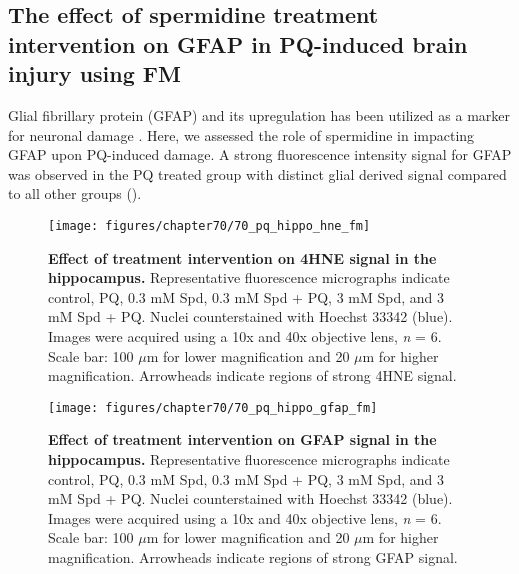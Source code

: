 \subsection{The effect of spermidine treatment intervention on GFAP in PQ-induced brain injury using FM} 
Glial fibrillary protein (GFAP) and its upregulation has been utilized as a marker for neuronal damage \citep{Wu2015}. Here, we assessed the role of spermidine in impacting GFAP upon PQ-induced damage. A strong fluorescence intensity signal for GFAP was observed in the PQ treated group with distinct glial derived signal compared to all other groups ().

\begin{landscape}
\begin{figure}[!htbp]
\center
  \texttt{[image: figures/chapter70/70\_pq\_hippo\_hne\_fm]}
  \caption[Effect of treatment intervention on 4HNE signal in the hippocampus]{\textbf{Effect of treatment intervention on 4HNE signal in the hippocampus.} Representative fluorescence micrographs indicate control, PQ, 0.3 mM Spd, 0.3 mM Spd + PQ, 3 mM Spd, and 3 mM Spd + PQ. Nuclei counterstained with Hoechst 33342 (blue). Images were acquired using a 10x and 40x objective lens, \textit{n} = 6. Scale bar: 100 $\mu$m for lower magnification and 20 $\mu$m for higher magnification. Arrowheads indicate regions of strong 4HNE signal.}
  \label{fig:70_pq_hippo_hne_fm}
\end{figure} 
\end{landscape}

\begin{landscape}
\begin{figure}[!htbp]
\center
  \texttt{[image: figures/chapter70/70\_pq\_hippo\_gfap\_fm]}
  \caption[Effect of treatment intervention on GFAP signal in the hippocampus]{\textbf{Effect of treatment intervention on GFAP signal in the hippocampus.} Representative fluorescence micrographs indicate control, PQ, 0.3 mM Spd, 0.3 mM Spd + PQ, 3 mM Spd, and 3 mM Spd + PQ. Nuclei counterstained with Hoechst 33342 (blue). Images were acquired using a 10x and 40x objective lens, \textit{n} = 6. Scale bar: 100 $\mu$m for lower magnification and 20 $\mu$m for higher magnification. Arrowheads indicate regions of strong GFAP signal.}
  \label{fig:70_pq_hippo_gfap_fm}
\end{figure} 
\end{landscape}

